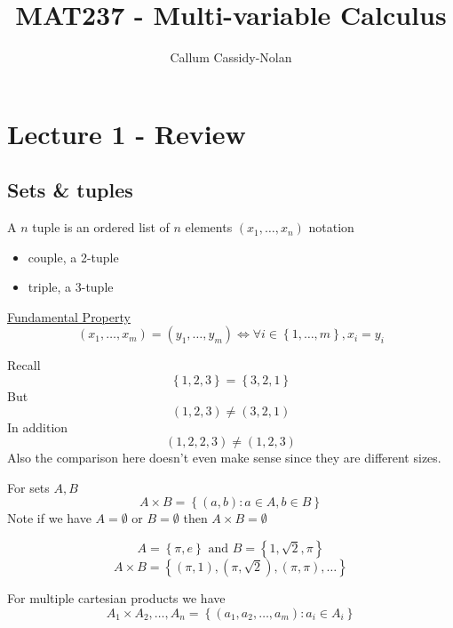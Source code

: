 \documentclass[11pt]{book}
\title{MAT237 - Multi-variable Calculus}
\author{Callum Cassidy-Nolan}
\begin{document}


\chapter{Lecture 1 - Review}%
\label{chp:lecture_1_review}

\section{Sets \& tuples}%
\label{sec:sets_&_tuples}



\begin{defn}[Tuple]\label{defn:tuple}
    A $n$ tuple is an ordered list of $n$ elements $\left( x_1, \ldots ,  x_{n}  \right) $ 
    notation 
    \begin{itemize}
        \item couple, a 2-tuple 
        \item triple, a 3-tuple 
    \end{itemize}
    \underline{Fundamental Property } 
    \[
        \left( x_1, \ldots , x_{m}  \right) = \left( y_{1} , \ldots , y_{m}  \right) \Leftrightarrow \forall i \in \left\{ 1, \ldots , m \right\}, x_{i} = y_{i} 
    \]
\end{defn}

Recall 
\[
\left\{ 1,2,3 \right\} = \left\{ 3,2,1 \right\} 
\]
But
\[
    \left( 1,2,3 \right) \neq \left( 3,2,1 \right) 
\]
In addition 
\[
    \left( 1,2,2,3 \right) \neq \left( 1,2,3 \right) 
\]
Also the comparison here doesn't even make sense since they are different sizes.

\begin{defn}\label{defn:cartesian_product}
    For sets $A,B$ 
    \[
        A\times B= \left\{ \left( a,b \right) : a \in A, b \in B \right\} 
    \]
    Note if we have $A= \emptyset $ or $B= \emptyset $ then $A\times B= \emptyset $  
\end{defn}

\begin{eg}
    \[
    A= \left\{ \pi , e \right\} \text{ and } B= \left\{ 1, \sqrt{2} , \pi  \right\} 
    \]
    \[
        A\times B = \left\{ \left( \pi , 1 \right) , \left( \pi , \sqrt{2}  \right) , \left( \pi , \pi  \right) ,\ldots  \right\} 
    \]
\end{eg}

For multiple cartesian products we have
\[
    A_{1} \times A_{2} , \ldots , A_{n} = \left\{ \left( a_1, a_2, \ldots , a_{m}  \right) : a_{i} \in A_{i}  \right\} 
\]
\end{document}
